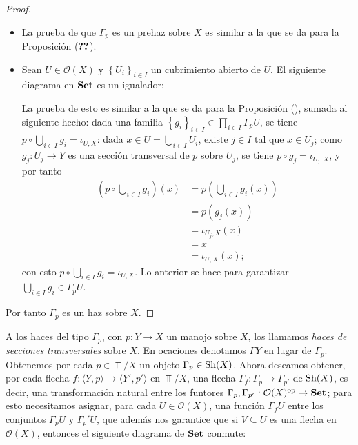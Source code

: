 \begin{proof}
   \begin{itemize}
      \item La prueba de que $\Gamma_p$ es un prehaz sobre $X$ es similar a la que se da para la Proposición ($\Ref{Prop:P1}$).
      \item Sean $U\in \mathcal{O}(X)$ y $\left\lbrace U_i\right\rbrace_{i\in I}$ un cubrimiento abierto de $U$. El siguiente diagrama en $\normalfont{\textbf{Set}}$ es un igualador:
         
         La prueba de esto es similar a la que se da para la Proposición (), sumada al siguiente hecho: dada una familia $\left\lbrace g_i\right\rbrace_{i\in I}\in \prod_{i\in I}\Gamma_p U$, se tiene $p\circ \bigcup_{i\in I} g_i=\iota_{U,X}$: dada $x\in U=\bigcup_{i\in I}U_i$, existe $j\in I$ tal que $x\in U_j$; como $g_j:U_j\to Y$ es una sección transversal de $p$ sobre $U_j$, se tiene $p\circ g_j = \iota_{U_j,X}$, y por tanto
         $$
         \begin{aligned}
            \left(p\circ \bigcup_{i\in I}g_i\right)(x)&=p\left( \bigcup_{i\in I}g_i(x)\right)\\
                                           &=p(g_j(x))\\
                                           &=\iota_{U_j,X}(x)\\
                                           &=x\\
                                           &=\iota_{U,X}(x);
         \end{aligned}
         $$
         con esto $p\circ \bigcup_{i\in I}g_i=\iota_{U,X}$. Lo anterior se hace para garantizar $\bigcup_{i\in I}g_i\in \Gamma_p U$.
   \end{itemize}
   Por tanto $\Gamma_p$ es un haz sobre $X$.
\end{proof}
A los haces del tipo $\Gamma_p$, con $p:Y\to X$ un manojo sobre $X$, los llamamos \textit{haces de secciones transversales} sobre $X$. En ocaciones denotamos $\Gamma Y$ en lugar de $\Gamma_p$. Obtenemos por cada $p\in\Top /X$ un objeto $\Gamma_p \in \normalfont{\text{Sh}} (X)$. Ahora deseamos obtener, por cada flecha $f:\langle Y,p \rangle \to \langle Y',p'\rangle$ en $\Top /X$, una flecha $\Gamma_f:\Gamma_p\to\Gamma_{p'}$ de $\normalfont{\text{Sh}}(X)$, es decir, una transformación natural entre los funtores $\Gamma_p,\Gamma_{p'}:\mathcal{O}(X)^\text{op}\to\normalfont{\textbf{Set}}$; para esto necesitamos asignar, para cada $U\in\mathcal{O}(X)$, una función $\Gamma_f U$ entre los conjuntos $\Gamma_p U$ y $\Gamma_p' U$, que además nos garantice que si $V\subseteq U$ es una flecha en $\mathcal{O}(X)$, entonces el siguiente diagrama de $\normalfont{\textbf{Set}}$ conmute:
